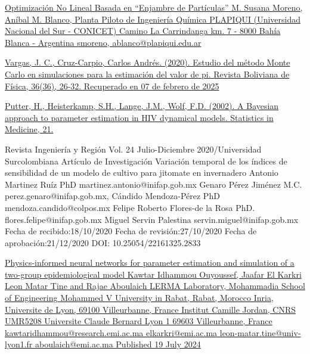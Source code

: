 \documentclass{article}
\begin{document}
\begin{itemize}
\begin{thebibliography}
{    \bibitem[18]  {}\href{https://cimat.repositorioinstitucional.mx/jspui/bitstream/1008/255/2/TE%20388.pdf}{Optimización No Lineal Basada en “Enjambre de Partículas” M. Susana Moreno, Aníbal M. Blanco, Planta Piloto de Ingeniería Química PLAPIQUI (Universidad Nacional del Sur - CONICET) Camino La Carrindanga km. 7 - 8000 Bahía Blanca - Argentina {smoreno, ablanco}@plapiqui.edu.ar}
    \label{sec:28}

    \bibitem[19]  {}\href{http://www.scielo.org.bo/scielo.php?script=sci_arttext&pid=S1562-38232020000100005&lng=es&tlng=es.}{Vargas, J. C., Cruz-Carpio, Carlos Andrés. (2020). Estudio del método Monte Carlo en simulaciones para la estimación del valor de pi. Revista Boliviana de Física, 36(36), 26-32. Recuperado en 07 de febrero de 2025}
    \label{sec:28}

    \bibitem[20]{}\href{https://www.semanticscholar.org/paper/A-Bayesian-approach-to-parameter-estimation-in-HIV-Putter-Heisterkamp/5eaa80435e642203bb1333011d1143a5b90577d2?utm_source=direct_link}{Putter, H., Heisterkamp, S.H., Lange, J.M.,  Wolf, F.D. (2002). A Bayesian approach to parameter estimation in HIV dynamical models. Statistics in Medicine, 21.}
    \label{sec:30}

    \bibitem[21]{}  Revista Ingeniería y Región Vol. 24 Julio-Diciembre 2020/Universidad Surcolombiana Artículo de Investigación Variación temporal de los índices de sensibilidad de un modelo de cultivo para jitomate en invernadero Antonio Martinez Ruíz PhD martinez.antonio@inifap.gob.mx Genaro Pérez Jiménez M.C. perez.genaro@inifap.gob.mx, Cándido Mendoza-Pérez PhD mendoza.candido@colpos.mx Felipe Roberto Flores-de la Rosa PhD. flores.felipe@inifap.gob.mx Miguel Servin Palestina servin.miguel@inifap.gob.mx Fecha de recibido:18/10/2020 Fecha de revisión:27/10/2020 Fecha de aprobación:21/12/2020 DOI: 10.25054/22161325.2833
    \label{sec:31}

    \bibitem[22]{} \href{https://theses.hal.science/INRIA/hal-04798230v1}{Physics-informed neural networks for parameter estimation and simulation of a two-group epidemiological model Kawtar Idhammou Ouyoussef, Jaafar El Karkri Leon Matar Tine and Rajae Aboulaich LERMA Laboratory, Mohammadia School of Engineering Mohammed V University in Rabat, Rabat, Morocco Inria, Universite de Lyon, 69100 Villeurbanne, France Institut Camille Jordan, CNRS UMR5208 Universite Claude Bernard Lyon 1 69603 Villeurbanne, France kawtaridhammou@research.emi.ac.ma elkarkri@emi.ac.ma leon-matar.tine@univ-lyon1.fr aboulaich@emi.ac.ma Published 19 July 2024} 
    \label{sec:32}

}
\end{thebibliography}
\end{itemize}
\end{document}
